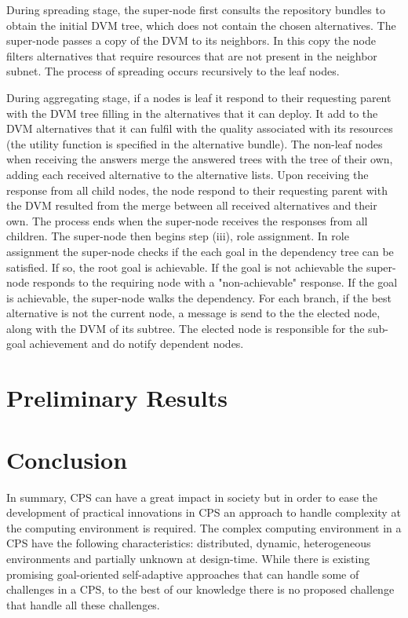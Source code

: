 \documentclass[conference]{IEEEtran}
\begin{document}
During spreading stage, the super-node first consults the repository bundles to obtain the initial DVM tree, which does not contain the chosen alternatives. The super-node passes a copy of the DVM to its neighbors. In this copy the node filters alternatives that require resources that are not present in the neighbor subnet. The process of spreading occurs recursively to the leaf nodes. 

During aggregating stage, if a nodes is leaf it respond to their requesting parent with the DVM tree filling in the alternatives that it can deploy. It add to the DVM alternatives that it can fulfil with the quality associated with its resources (the utility function is specified in the alternative bundle). The non-leaf nodes when receiving the answers merge the answered trees with the tree of their own, adding each received alternative to the alternative lists. Upon receiving the response from all child nodes, the node respond to their requesting parent with the DVM resulted from the merge between all received alternatives and their own. The process ends when the super-node receives the responses from all children. The super-node then begins step (iii),  role assignment. In role assignment the super-node checks if the each goal in the dependency tree can be satisfied. If so, the root goal is achievable. If the goal is not achievable the super-node responds to the requiring node with a "non-achievable" response. If the goal is achievable, the super-node walks the dependency. For each branch, if the best alternative is not the current node, a message is send to the the elected node, along with the DVM of its subtree. The elected node is responsible for the sub-goal achievement and do notify dependent nodes. 



\section{Preliminary Results}


\section{Conclusion}
In summary, CPS can have a great impact in society but in order to ease the development of practical innovations in CPS an approach to handle complexity at the computing environment is required. The complex computing environment in a CPS have the following characteristics: distributed, dynamic, heterogeneous environments and partially unknown at design-time. While there is existing promising goal-oriented self-adaptive approaches that can handle some of challenges in a CPS, to the best of our knowledge there is no proposed challenge that handle all these challenges. 
\end{document}
